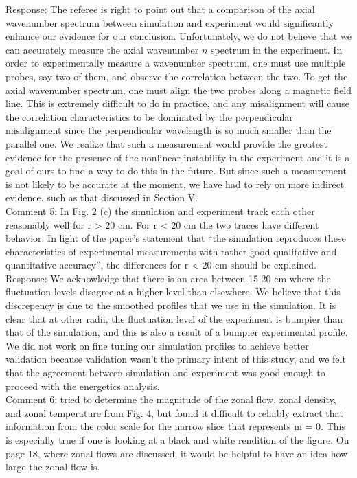 \documentclass[12pt]{article}
\begin{document}
Response: The referee is right to point out that a comparison of the axial wavenumber spectrum between simulation and experiment would significantly enhance our evidence for our conclusion.
Unfortunately, we do not believe that we can accurately measure the axial wavenumber $n$ spectrum in the experiment. In order to experimentally measure a wavenumber spectrum, one must
use multiple probes, say two of them, and observe the correlation between the two. To get the axial wavenumber spectrum, one must align the two probes along a magnetic field line.
This is extremely difficult to do in practice, and any misalignment will cause the correlation characteristics to be dominated by the perpendicular misalignment since the perpendicular
wavelength is so much smaller than the parallel one. We realize that such a measurement would provide the greatest
evidence for the presence of the nonlinear instability in the experiment and it is a goal of ours to find a way to do this in the future. 
But since such a measurement is not likely to be accurate at the moment, we have had to rely on more indirect evidence, such as that discussed in Section V. \\
   

Comment 5: In Fig. 2 (c) the simulation and experiment track each other reasonably well for r > 20
cm. For r < 20 cm the two traces have different behavior. In light of the paper’s
statement that “the simulation reproduces these characteristics of experimental
measurements with rather good qualitative and quantitative accuracy”, the differences for
r < 20 cm should be explained. \\

Response: We acknowledge that there is an area between 15-20 cm where the fluctuation levels disagree at a higher level than elsewhere. We believe that this discrepency is due to the smoothed
profiles that we use in the simulation. It is clear that at other radii, the fluctuation level of the experiment is bumpier than that of the simulation, and this is also a result
of a bumpier experimental profile. We did not work on fine tuning our simulation profiles to achieve better validation because validation wasn't the primary intent of this study,
and we felt that the agreement between simulation and experiment was good enough to proceed with the energetics analysis. \\

Comment 6:      tried to determine the magnitude of the zonal flow, zonal density, and zonal
temperature from Fig. 4, but found it difficult to reliably extract that information from the
color scale for the narrow slice that represents m = 0. This is especially true if one is
looking at a black and white rendition of the figure. On page 18, where zonal flows are
discussed, it would be helpful to have an idea how large the zonal flow is. \\
\end{document}
